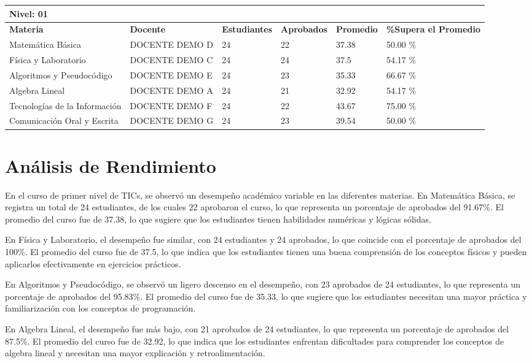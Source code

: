 \small
\begin{tabularx}{\textwidth}{|p{2.5cm}|p{2.5cm}|X|X|X|X|}
\hline
\multicolumn{6}{|X|}{\textbf{Nivel: 01 }}\\\hline\textbf{Materia} & \textbf{Docente} & \textbf{Estudiantes} & \textbf{Aprobados} & \textbf{Promedio} & \textbf{\%Supera el Promedio} \\ \hline
Matemática Básica & DOCENTE DEMO D & 24 & 22 & 37.38 & 50.00 \%\\ \hline
Física y Laboratorio & DOCENTE DEMO C & 24 & 24 & 37.5 & 54.17 \%\\ \hline
Algoritmos y Pseudocódigo & DOCENTE DEMO E & 24 & 23 & 35.33 & 66.67 \%\\ \hline
Algebra Lineal & DOCENTE DEMO A & 24 & 21 & 32.92 & 54.17 \%\\ \hline
Tecnologías de la Información  & DOCENTE DEMO F & 24 & 22 & 43.67 & 75.00 \%\\ \hline
Comunicación Oral y Escrita & DOCENTE DEMO G & 24 & 23 & 39.54 & 50.00 \%\\ \hline
\end{tabularx}

\vspace{1cm}
\section{Análisis de Rendimiento}
En el curso de primer nivel de TICs, se observó un desempeño académico variable en las diferentes materias. En Matemática Básica, se registra un total de 24 estudiantes, de los cuales 22 aprobaron el curso, lo que representa un porcentaje de aprobados del 91.67\%. El promedio del curso fue de 37.38, lo que sugiere que los estudiantes tienen habilidades numéricas y lógicas sólidas.

En Física y Laboratorio, el desempeño fue similar, con 24 estudiantes y 24 aprobados, lo que coincide con el porcentaje de aprobados del 100\%. El promedio del curso fue de 37.5, lo que indica que los estudiantes tienen una buena comprensión de los conceptos físicos y pueden aplicarlos efectivamente en ejercicios prácticos.

En Algoritmos y Pseudocódigo, se observó un ligero descenso en el desempeño, con 23 aprobados de 24 estudiantes, lo que representa un porcentaje de aprobados del 95.83\%. El promedio del curso fue de 35.33, lo que sugiere que los estudiantes necesitan una mayor práctica y familiarización con los conceptos de programación.

En Algebra Lineal, el desempeño fue más bajo, con 21 aprobados de 24 estudiantes, lo que representa un porcentaje de aprobados del 87.5\%. El promedio del curso fue de 32.92, lo que indica que los estudiantes enfrentan dificultades para comprender los conceptos de algebra lineal y necesitan una mayor explicación y retroalimentación.

